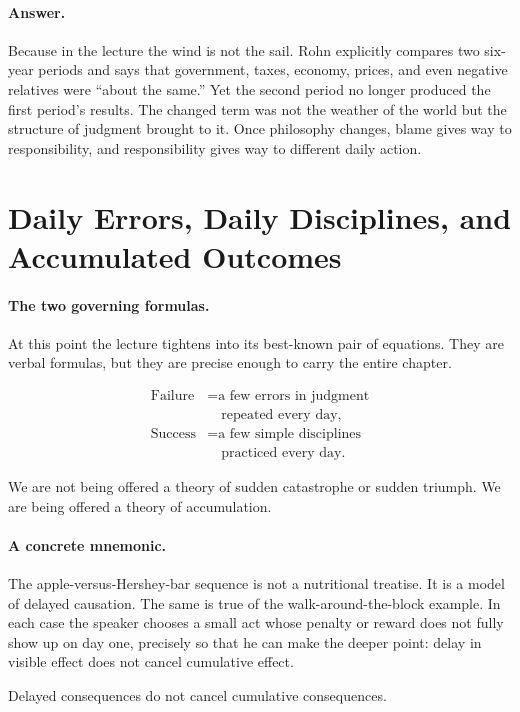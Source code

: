 \paragraph{Answer.}
Because in the lecture the wind is not the sail. Rohn explicitly compares two six-year periods and says that government, taxes, economy, prices, and even negative relatives were ``about the same.'' Yet the second period no longer produced the first period's results. The changed term was not the weather of the world but the structure of judgment brought to it. Once philosophy changes, blame gives way to responsibility, and responsibility gives way to different daily action.

\section{Daily Errors, Daily Disciplines, and Accumulated Outcomes}

\paragraph{The two governing formulas.}
At this point the lecture tightens into its best-known pair of equations. They are verbal formulas, but they are precise enough to carry the entire chapter.

\begin{align}
\text{Failure} &= \text{a few errors in judgment} \\
&\quad \text{repeated every day}, \\
\text{Success} &= \text{a few simple disciplines} \\
&\quad \text{practiced every day}.
\end{align}

We are not being offered a theory of sudden catastrophe or sudden triumph. We are being offered a theory of accumulation.

\paragraph{A concrete mnemonic.}
The apple-versus-Hershey-bar sequence is not a nutritional treatise. It is a model of delayed causation. The same is true of the walk-around-the-block example. In each case the speaker chooses a small act whose penalty or reward does not fully show up on day one, precisely so that he can make the deeper point: delay in visible effect does not cancel cumulative effect.

\begin{proposition}
Delayed consequences do not cancel cumulative consequences.
\end{proposition}

